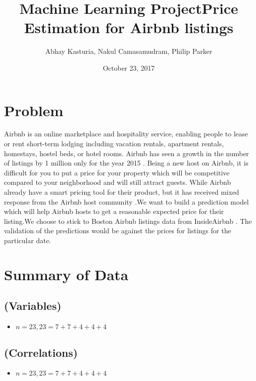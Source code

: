 \documentclass[a4paper, 12pt]{scrartcl}
\title{Machine Learning Project\newline Price Estimation for Airbnb listings}
\author{Abhay Kasturia, Nakul Camasamudram, Philip Parker}
\date{October 23, 2017}
\begin{document}
\begin{titlepage}
\maketitle  
\thispagestyle{empty}
\end{titlepage}
\addtocounter{page}{-1}

\section{Problem} 
Airbnb is an online marketplace and hospitality service, enabling people to lease or rent short-term lodging including vacation rentals, apartment rentals, homestays, hostel beds, or hotel rooms.\cite{wiki} \newline Airbnb has seen a growth in the number of listings by 1 million only for the year 2015 \cite {airdna}. Being a new host on Airbnb, it is difficult for you to put a price for your property which will be competitive compared to your neighborhood and will still attract guests.  While Airbnb already have a smart pricing tool for their product, but it has received mixed response from the Airbnb host community \cite{airbnbreview}.\newline We want to build a prediction model which will help Airbnb hosts to get a reasonable expected price for their listing.\newline We choose to stick to Boston Airbnb listings data from InsideAirbnb \cite{insideairbnb}. The validation of the predictions would be against the prices for listings for the particular date.\newline

\section{Summary of Data} 
\subsection{(Variables)} 
\begin{itemize}
\item $n=23, 23=7+7+4+4+4$
\end{itemize}

\subsection{(Correlations)} 
\begin{itemize}
	\item $n=23, 23=7+7+4+4+4$
\end{itemize}
\end{document}
